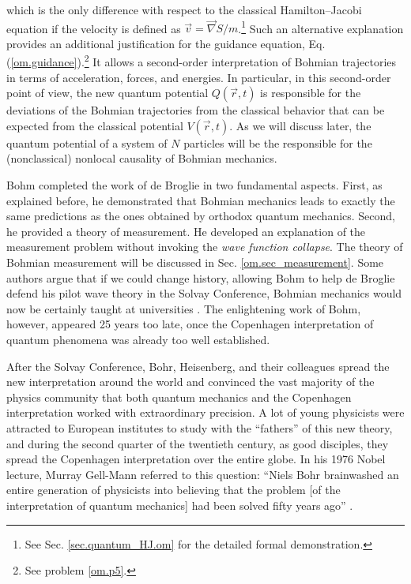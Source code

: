 \documentclass[onecolumn,nofootinbib, secnumarabic, amsmath, nobibnotes,12pt,aps,pra]{revtex4-1}
\newcommand{\sref}[1]{Sec. \ref{#1}}
\newcommand{\eref}[1]{Eq. (\ref{#1})}
\begin{document}
which is the only difference with respect to the classical
Hamilton--Jacobi equation if the velocity is defined as $\vec{v} =
\vec{\nabla}S / m$.\footnote{See \sref{sec.quantum_HJ.om} for the
detailed formal demonstration.} Such an alternative explanation
provides an additional justification for the guidance equation,
\eref{om.guidance}.\footnote{See problem \ref{om.p5}.} It allows a
second-order interpretation of Bohmian trajectories in terms of
acceleration, forces, and energies. In particular, in this
second-order point of view, the new quantum potential $Q(\vec{r},t)$
is responsible for the deviations of the Bohmian trajectories from
the classical behavior that can be expected from the classical
potential $V(\vec{r},t)$. As we will discuss later, the quantum
potential of a system of $N$ particles will be the responsible for
the (nonclassical) nonlocal causality of Bohmian mechanics.

Bohm completed the work of de Broglie in two fundamental aspects. First, as explained before, he demonstrated that Bohmian mechanics leads to exactly the same predictions as the ones obtained by orthodox quantum mechanics. Second, he provided a theory of measurement. He developed an explanation of the measurement problem without invoking the \textit{wave function collapse}. The theory of Bohmian measurement will be discussed in \sref{om.sec_measurement}. Some authors argue that if we could change history, allowing Bohm to help de Broglie defend his pilot wave theory in the Solvay Conference, Bohmian mechanics would now be certainly taught at universities \cite{om.nikolic2008a}. The enlightening work of Bohm, however, appeared 25 years too late, once the Copenhagen interpretation of quantum phenomena was already too well established.

After the Solvay Conference, Bohr, Heisenberg, and their colleagues
spread the new interpretation around the world and convinced the
vast majority of the physics community that both quantum mechanics
and the Copenhagen interpretation worked with extraordinary precision. A lot of
young physicists were attracted to European institutes to study with
the ``fathers'' of this new theory, and during the second quarter of
the twentieth century, as good disciples, they spread the Copenhagen
interpretation over the entire globe. In his 1976 Nobel lecture,
Murray Gell-Mann referred to this question: ``Niels Bohr brainwashed
an entire generation of physicists into believing that the problem
[of the interpretation of quantum mechanics] had been solved fifty
years ago'' \cite{om.hard}.
\end{document}
